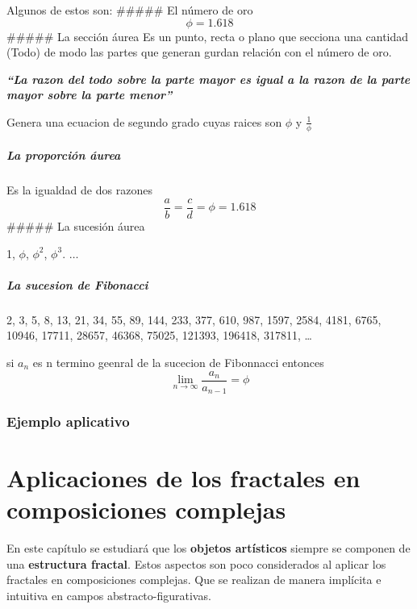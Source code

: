 \documentclass[
  11pt,
]{krantz}
\theoremstyle{definition}
\theoremstyle{definition}
\theoremstyle{definition}
\theoremstyle{definition}
\theoremstyle{remark}
\begin{document}
Algunos de estos son:
\#\#\#\#\# El número de oro
\[\phi=1.618\]
\#\#\#\#\# La sección áurea
Es un punto, recta o plano que secciona una cantidad (Todo) de modo las partes que generan gurdan relación con el número de oro.

\textbf{\emph{``La razon del todo sobre la parte mayor es igual a la razon de la parte mayor sobre la parte menor''}}

Genera una ecuacion de segundo grado cuyas raices son \(\phi\) y \(\frac{1}{\phi}\)

\hypertarget{la-proporciuxf3n-uxe1urea}{%
\paragraph{La proporción áurea}\label{la-proporciuxf3n-uxe1urea}}

Es la igualdad de dos razones \[\frac{a}{b}=\frac{c}{d}=\phi=1.618\]
\#\#\#\#\# La sucesión áurea

1, \(\phi\), \(\phi^2\), \(\phi^3\). \(\ldots\)

\hypertarget{la-sucesion-de-fibonacci}{%
\paragraph{La sucesion de Fibonacci}\label{la-sucesion-de-fibonacci}}

2, 3, 5, 8, 13, 21, 34, 55, 89, 144, 233, 377, 610, 987, 1597, 2584, 4181, 6765, 10946, 17711, 28657, 46368, 75025, 121393, 196418, 317811, \ldots{}

si \(a_n\) es n termino geenral de la sucecion de Fibonnacci entonces
\[ \lim_{n \to \infty} \frac{a_n}{a_{n-1}}=\phi  \]

\hypertarget{ejemplo-aplicativo}{%
\subsection{Ejemplo aplicativo}\label{ejemplo-aplicativo}}

\hypertarget{aplicaciones-de-los-fractales-en-composiciones-complejas}{%
\chapter{Aplicaciones de los fractales en composiciones complejas}\label{aplicaciones-de-los-fractales-en-composiciones-complejas}}

En este capítulo se estudiará que los \textbf{objetos artísticos} siempre se componen de una \textbf{estructura fractal}. Estos aspectos son poco considerados al aplicar los fractales en composiciones complejas. Que se realizan de manera implícita e intuitiva en campos abstracto-figurativas.
\end{document}
